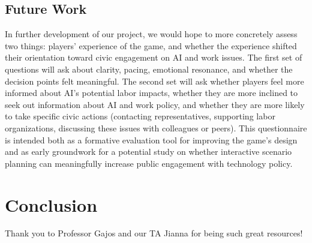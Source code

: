 \documentclass[sigconf,authordraft]{acmart}
\begin{document}
\subsection{Future Work}

In further development of our project, we would hope to more concretely assess two things: players' experience of the game, and whether the experience shifted their orientation toward civic engagement on AI and work issues. The first set of questions will ask about clarity, pacing, emotional resonance, and whether the decision points felt meaningful. The second set will ask whether players feel more informed about AI's potential labor impacts, whether they are more inclined to seek out information about AI and work policy, and whether they are more likely to take specific civic actions (contacting representatives, supporting labor organizations, discussing these issues with colleagues or peers). This questionnaire is intended both as a formative evaluation tool for improving the game's design and as early groundwork for a potential study on whether interactive scenario planning can meaningfully increase public engagement with technology policy.



\section{Conclusion}



\begin{acks}
Thank you to Professor Gajos and our TA Jianna for being such great resources!
\end{acks}







\appendix
\end{document}
